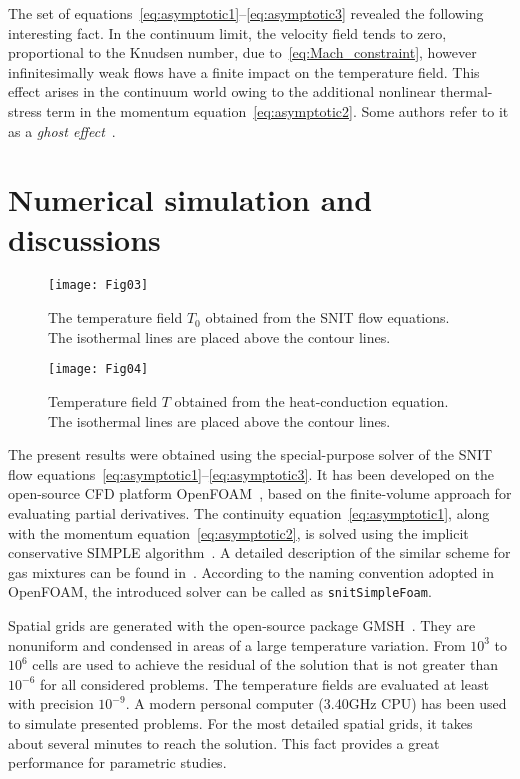 \documentclass[smallextended]{svjour3} %
\begin{document}
The set of equations~\eqref{eq:asymptotic1}--\eqref{eq:asymptotic3} revealed the following interesting fact.
In the continuum limit, the velocity field tends to zero, proportional to the Knudsen number,
due to~\eqref{eq:Mach_constraint}, however infinitesimally weak flows
have a finite impact on the temperature field.
This effect arises in the continuum world owing to the additional nonlinear thermal-stress term
in the momentum equation~\eqref{eq:asymptotic2}.
Some authors refer to it as a \emph{ghost effect}~\cite{Sone2002, Sone2007}.

\section{Numerical simulation and discussions}

\begin{figure}[ht]
    \centering
    \texttt{[image: Fig03]}
    \caption{The temperature field \(T_0\) obtained from the SNIT flow equations.
        The isothermal lines are placed above the contour lines.}
    \label{fig:moving:T_asym}
\end{figure}

\begin{figure}[ht]
    \centering
    \texttt{[image: Fig04]}
    \caption{Temperature field \(T\) obtained from the heat-conduction equation.
        The isothermal lines are placed above the contour lines.}
    \label{fig:moving:T_heat}
\end{figure}

The present results were obtained using the special-purpose solver of
the SNIT flow equations~\eqref{eq:asymptotic1}--\eqref{eq:asymptotic3}.
It has been developed on the open-source CFD platform OpenFOAM\textregistered{}~\cite{OpenFOAM1998},
based on the finite-volume approach for evaluating partial derivatives.
The continuity equation~\eqref{eq:asymptotic1}, along with the momentum equation~\eqref{eq:asymptotic2},
is solved using the implicit conservative SIMPLE algorithm~\cite{SIMPLE}.
A detailed description of the similar scheme for gas mixtures can be found in~\cite{Laneryd2007}.
According to the naming convention adopted in OpenFOAM\textregistered{},
the introduced solver can be called as \verb+snitSimpleFoam+.

Spatial grids are generated with the open-source package GMSH~\cite{GMSH}.
They are nonuniform and condensed in areas of a large temperature variation.
From \(10^3\) to \(10^6\) cells are used to achieve the residual of the solution
that is not greater than \(10^{-6}\) for all considered problems.
The temperature fields are evaluated at least with precision \(10^{-9}\).
A modern personal computer (3.40GHz CPU) has been used to simulate presented problems.
For the most detailed spatial grids, it takes about several minutes to reach the solution.
This fact provides a great performance for parametric studies.
\end{document}
